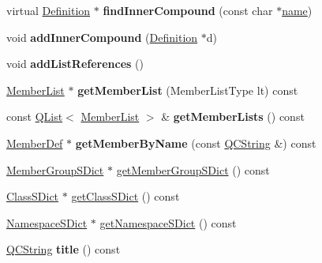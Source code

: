 \begin{DoxyCompactItemize}
\item 
\hypertarget{class_namespace_def_a5f4c10da520e9553c62483027168c42c}{virtual \hyperlink{class_definition}{Definition} $\ast$ {\bfseries find\-Inner\-Compound} (const char $\ast$\hyperlink{class_definition_a2c310e06c9aadc6fb218f80fcbb5c695}{name})}\label{class_namespace_def_a5f4c10da520e9553c62483027168c42c}

\item 
\hypertarget{class_namespace_def_a98509b9197b57394494196e01c70e540}{void {\bfseries add\-Inner\-Compound} (\hyperlink{class_definition}{Definition} $\ast$d)}\label{class_namespace_def_a98509b9197b57394494196e01c70e540}

\item 
\hypertarget{class_namespace_def_a6b28c57cb8b05f6fe38f771e62b9aa17}{void {\bfseries add\-List\-References} ()}\label{class_namespace_def_a6b28c57cb8b05f6fe38f771e62b9aa17}

\item 
\hypertarget{class_namespace_def_ad83336a442ba60d58c394f209406d8c2}{\hyperlink{class_member_list}{Member\-List} $\ast$ {\bfseries get\-Member\-List} (Member\-List\-Type lt) const }\label{class_namespace_def_ad83336a442ba60d58c394f209406d8c2}

\item 
\hypertarget{class_namespace_def_a07df9da2a270da9811acecc6f1b3f302}{const \hyperlink{class_q_list}{Q\-List}$<$ \hyperlink{class_member_list}{Member\-List} $>$ \& {\bfseries get\-Member\-Lists} () const }\label{class_namespace_def_a07df9da2a270da9811acecc6f1b3f302}

\item 
\hypertarget{class_namespace_def_ae4b1361bd609c705db962bd9bb8e1afe}{\hyperlink{class_member_def}{Member\-Def} $\ast$ {\bfseries get\-Member\-By\-Name} (const \hyperlink{class_q_c_string}{Q\-C\-String} \&) const }\label{class_namespace_def_ae4b1361bd609c705db962bd9bb8e1afe}

\item 
\hyperlink{class_member_group_s_dict}{Member\-Group\-S\-Dict} $\ast$ \hyperlink{class_namespace_def_a614eab46ad0165205bfc3367124bce0a}{get\-Member\-Group\-S\-Dict} () const 
\item 
\hyperlink{class_class_s_dict}{Class\-S\-Dict} $\ast$ \hyperlink{class_namespace_def_a9f94a6deac6af811489656badd13fa82}{get\-Class\-S\-Dict} () const 
\item 
\hyperlink{class_namespace_s_dict}{Namespace\-S\-Dict} $\ast$ \hyperlink{class_namespace_def_ad03a0f967ecf828380d717ce5d4f4d30}{get\-Namespace\-S\-Dict} () const 
\item 
\hypertarget{class_namespace_def_adf5241b59706e696c508de8baa4c2f97}{\hyperlink{class_q_c_string}{Q\-C\-String} {\bfseries title} () const }\label{class_namespace_def_adf5241b59706e696c508de8baa4c2f97}

\end{DoxyCompactItemize}
